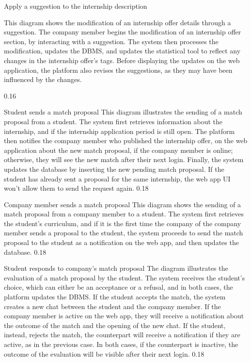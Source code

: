 \runtimeview
{Apply a suggestion to the internship description}
{
    This diagram shows the modification of an internship offer details through a suggestion.
    The company member begins the modification of an internship offer section, by interacting with a suggestion. The system then processes the modification, updates the DBMS, and updates the statistical tool to reflect any changes in the internship offer's tags.
    Before displaying the updates on the web application, the platform also revises the suggestions, as they may have been influenced by the changes.

}
{0.16}

\runtimeview
{Student sends a match proposal}
{
    This diagram illustrates the sending of a match proposal from a student. The system first 
    retrieves information about the internship, and if the internship application period is 
    still open. The platform then notifies the company member 
    who published the internship offer, on the web application 
    about the new match proposal, if the company member is online; otherwise, they will see the 
    new match after their next login. Finally, the system updates the database by inserting the 
    new pending match proposal. If the student has already sent a proposal for the same internship, 
    the web app UI won't allow them to send the request again.
}
{0.18}

\runtimeview
{Company member sends a match proposal}
{
    This diagram shows the sending of a match proposal from a company member to a student. 
    The system first retrieves the student's curriculum, and if it is the first time the company
     of the company member sends a proposal to the student, the system proceeds to send the match
      proposal to the student as a notification on the web app, and then updates the database.
}
{0.18}

\runtimeview
{Student responds to company's match proposal}
{
    The diagram illustrates the evaluation of a match proposal by the student. The system 
    receives the student's choice, which can either be an acceptance or a refusal, and in 
    both cases, the platform updates the DBMS. If the student accepts the match, the system 
    creates a new chat between the student and the company member. If the company member is 
    active on the web app, they will receive a notification about the outcome of the match and 
    the opening of the new chat. If the student, instead, rejects the match, the counterpart will 
    receive a notification if they are active, as in the previous case. In both cases, if the 
    counterpart is inactive, the outcome of the evaluation will be visible after their next login.
}
{0.18}


